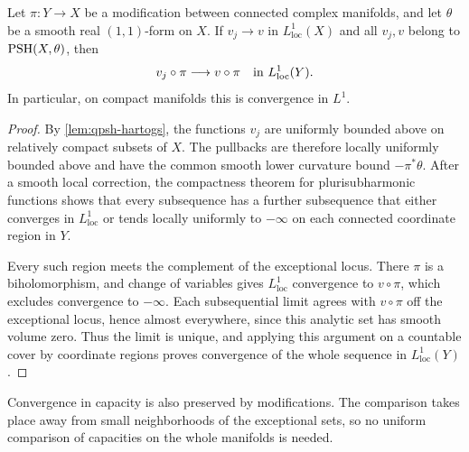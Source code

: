 \begin{lemma}\label{lem:modification-lone-pullback}
Let $\pi\colon Y\to X$ be a modification between connected complex manifolds, and let $\theta$ be a smooth real $(1,1)$-form on $X$. If $v_j\to v$ in $L^1_{\mathrm{loc}}(X)$ and all $v_j,v$ belong to $\mathrm{PSH}(X,\theta)$, then
\[
 v_j\circ\pi\longrightarrow v\circ\pi
       \quad\hbox{in }L^1_{\mathrm{loc}}(Y).
\]
In particular, on compact manifolds this is convergence in $L^1$.
\end{lemma}
\begin{proof}
By \cref{lem:qpsh-hartogs}, the functions $v_j$ are uniformly bounded above on relatively compact subsets of $X$. The pullbacks are therefore locally uniformly bounded above and have the common smooth lower curvature bound $-\pi^*\theta$. After a smooth local correction, the compactness theorem for plurisubharmonic functions shows that every subsequence has a further subsequence that either converges in $L^1_{\mathrm{loc}}$ or tends locally uniformly to $-\infty$ on each connected coordinate region in $Y$.

Every such region meets the complement of the exceptional locus. There $\pi$ is a biholomorphism, and change of variables gives $L^1_{\mathrm{loc}}$ convergence to $v\circ\pi$, which excludes convergence to $-\infty$. Each subsequential limit agrees with $v\circ\pi$ off the exceptional locus, hence almost everywhere, since this analytic set has smooth volume zero. Thus the limit is unique, and applying this argument on a countable cover by coordinate regions proves convergence of the whole sequence in $L^1_{\mathrm{loc}}(Y)$.
\end{proof}

Convergence in capacity is also preserved by modifications. The comparison takes place away from small neighborhoods of the exceptional sets, so no uniform comparison of capacities on the whole manifolds is needed.

